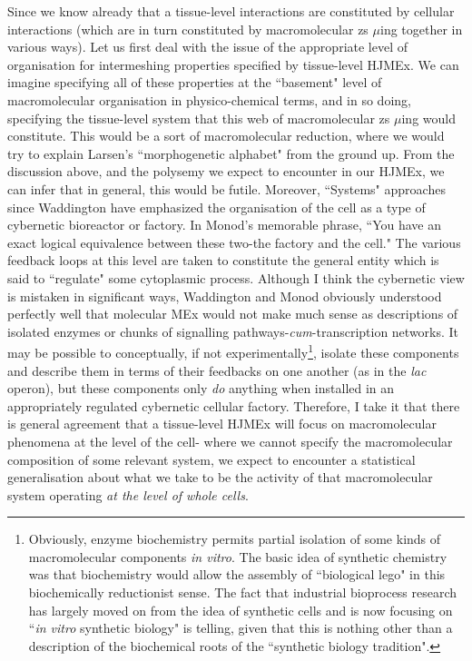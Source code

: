 Since we know already that a tissue-level interactions are constituted by cellular interactions (which are in turn constituted by macromolecular zs $\mu$ing together in various ways). Let us first deal with the issue of the appropriate level of organisation for intermeshing properties specified by tissue-level HJMEx. We can imagine specifying all of these properties at the ``basement" level of macromolecular organisation in physico-chemical terms, and in so doing, specifying the tissue-level system that this web of macromolecular zs $\mu$ing would constitute. This would be a sort of macromolecular reduction, where we would try to explain Larsen's ``morphogenetic alphabet" \cite{Larsen1987} from the ground up. From the discussion above, and the polysemy we expect to encounter in our HJMEx, we can infer that in general, this would be futile. Moreover, ``Systems" approaches since Waddington have emphasized the organisation of the cell as a type of cybernetic bioreactor or factory. In Monod's memorable phrase, ``You have an exact logical equivalence between these two-the factory and the cell." The various feedback loops at this level are taken to constitute the general entity which is said to ``regulate" some cytoplasmic process. Although I think the cybernetic view is mistaken in significant ways, Waddington and Monod obviously understood perfectly well that molecular MEx would not make much sense as descriptions of isolated enzymes or chunks of signalling pathways-\textit{cum}-transcription networks. It may be possible to conceptually, if not experimentally\footnote{Obviously, enzyme biochemistry permits partial isolation of some kinds of macromolecular components \textit{in vitro}. The basic idea of synthetic chemistry was that biochemistry would allow the assembly of ``biological lego" in this biochemically reductionist sense. The fact that industrial bioprocess research has largely moved on from the idea of synthetic cells and is now focusing on ``\textit{in vitro} synthetic biology" is telling, given that this is nothing other than a description of the biochemical roots of the ``synthetic biology tradition".}, isolate these components and describe them in terms of their feedbacks on one another (as in the \textit{lac} operon), but these components only \textit{do} anything when installed in an appropriately regulated cybernetic cellular factory. Therefore, I take it that there is general agreement that a tissue-level HJMEx will focus on macromolecular phenomena at the level of the cell- where we cannot specify the macromolecular composition of some relevant system, we expect to encounter a statistical generalisation about what we take to be the activity of that macromolecular system operating \textit{at the level of whole cells}. 
 
